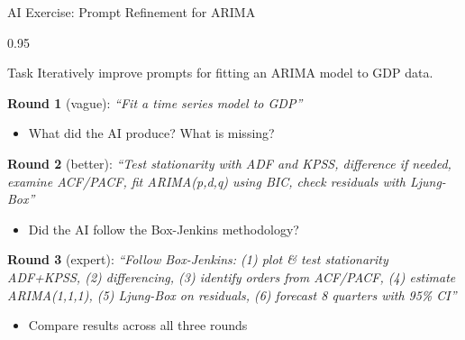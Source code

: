 \documentclass[9pt, aspectratio=169, t]{beamer}
\begin{document}
\begin{frame}[shrink=5]{AI Exercise: Prompt Refinement for ARIMA}
    \begin{cminipage}{0.95\textwidth}
    \begin{block}{Task}
        Iteratively improve prompts for fitting an ARIMA model to GDP data.
    \end{block}

    \vspace{0.2cm}

    \textbf{Round 1} (vague): \textit{``Fit a time series model to GDP''}
    \begin{itemize}\setlength{\itemsep}{0pt}
        \item What did the AI produce? What is missing?
    \end{itemize}

    \textbf{Round 2} (better): \textit{``Test stationarity with ADF and KPSS, difference if needed, examine ACF/PACF, fit ARIMA(p,d,q) using BIC, check residuals with Ljung-Box''}
    \begin{itemize}\setlength{\itemsep}{0pt}
        \item Did the AI follow the Box-Jenkins methodology?
    \end{itemize}

    \textbf{Round 3} (expert): \textit{``Follow Box-Jenkins: (1) plot \& test stationarity ADF+KPSS, (2) differencing, (3) identify orders from ACF/PACF, (4) estimate ARIMA(1,1,1), (5) Ljung-Box on residuals, (6) forecast 8 quarters with 95\% CI''}
    \begin{itemize}\setlength{\itemsep}{0pt}
        \item Compare results across all three rounds
    \end{itemize}
    \end{cminipage}
\end{frame}
\end{document}
